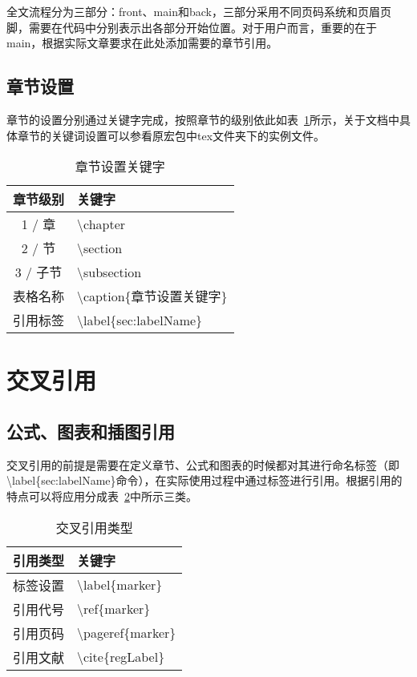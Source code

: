 全文流程分为三部分：front、main和back，三部分采用不同页码系统和页眉页脚，需要在代码中分别表示出各部分开始位置。对于用户而言，重要的在于main，根据实际文章要求在此处添加需要的章节引用。

\subsection{章节设置}
章节的设置分别通过关键字完成，按照章节的级别依此如表~\ref{tab:setSection}所示，关于文档中具体章节的关键词设置可以参看原宏包中tex文件夹下的实例文件。


\begin{table}
 \centering
  \caption{章节设置关键字}     %
  \label{tab:setSection}    %
  \begin{tabular}{cl}
    \hline
    章节级别        & 关键字     \\
    \hline
    1 / 章        & \textbackslash chapter \\
    2 / 节        & \textbackslash section \\
    3 / 子节      & \textbackslash  subsection \\
    表格名称       & \textbackslash caption\{章节设置关键字\} \\
    引用标签       & \textbackslash label\{sec:labelName\} \\
    \hline
  \end{tabular}
\end{table}


\section{交叉引用}
\subsection{公式、图表和插图引用}
交叉引用的前提是需要在定义章节、公式和图表的时候都对其进行命名标签（即\textbackslash label\{sec:labelName\}命令），在实际使用过程中通过标签进行引用。根据引用的特点可以将应用分成表~\ref{tab:citeType}中所示三类。

\begin{table}
 \centering
  \caption{交叉引用类型}       %
  \label{tab:citeType}    %
  \begin{tabular}{cl}
    \hline
    引用类型     & 关键字     \\
    \hline
    标签设置        & \textbackslash label\{marker\}  \\
    引用代号        & \textbackslash ref\{marker\}    \\
    引用页码        & \textbackslash pageref\{marker\} \\
    引用文献        & \textbackslash cite\{regLabel\} \\
    \hline
  \end{tabular}
\end{table}

